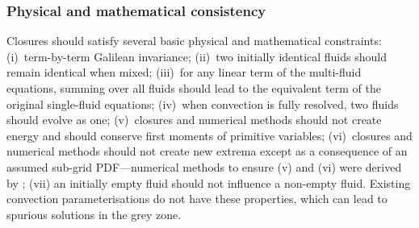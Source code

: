 \documentclass[11pt,a4paper]{article}
\begin{document}
\subsubsection*{Physical and mathematical consistency}

Closures should satisfy several basic physical and mathematical constraints:
(i)~term-by-term Galilean invariance;
(ii)~two initially identical fluids should remain identical when mixed;
(iii)~for any linear term of the multi-fluid equations, summing over all fluids should lead to the equivalent term of the original single-fluid equations;
(iv)~when convection is fully resolved, two fluids should evolve as one;
(v)~closures and numerical methods should not create energy and should conserve first moments of primitive variables;
(vi)~closures and numerical methods should not create new extrema except as a consequence of an assumed sub-grid PDF---numerical methods to ensure (v) and (vi) were derived by \cite{MWH20};
(vii) an initially empty fluid should not influence a non-empty fluid.
Existing convection parameterisations do not have these properties, which can lead to spurious solutions in the grey zone.
\end{document}
